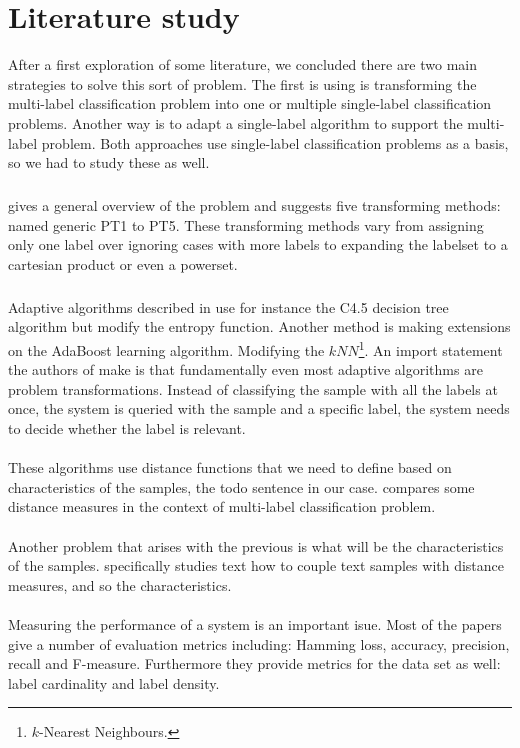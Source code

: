 \section{Literature study}
After a first exploration of some literature, we concluded there are two main strategies to solve this sort of problem. The first is using is transforming the multi-label classification problem into one or multiple single-label classification problems. Another way is to adapt a single-label algorithm to support the multi-label problem. Both approaches use single-label classification problems as a basis, so we had to study these as well.
\subparagraph{}
\cite{Tsoumakas07multi-labelclassification:} gives a general overview of the problem and suggests five transforming methods: named generic PT1 to PT5. These transforming methods vary from assigning only one label over ignoring cases with more labels to expanding the labelset to a cartesian product or even a powerset.
\subparagraph{}
Adaptive algorithms described in \cite{Tsoumakas07multi-labelclassification:} use for instance the C4.5 decision tree algorithm but modify the entropy function. Another method is making extensions on the AdaBoost learning algorithm. Modifying the $kNN$\footnote{$k$-Nearest Neighbours.}. An import statement the authors of \cite{Tsoumakas07multi-labelclassification:} make is that fundamentally even most adaptive algorithms are problem transformations. Instead of classifying the sample with all the labels at once, the system is queried with the sample and a specific label, the system needs to decide whether the label is relevant.
\paragraph{}
These algorithms use distance functions that we need to define based on characteristics of the samples, the todo sentence in our case. \cite{gjorgjioskicomparison} compares some distance measures in the context of multi-label classification problem.
\paragraph{}
Another problem that arises with the previous is what will be the characteristics of the samples. \cite{jing2006ontology} specifically studies text how to couple text samples with distance measures, and so the characteristics.
\paragraph{}
Measuring the performance of a system is an important isue. Most of the papers \cite{KTV08, park2008dimension, Tsoumakas07multi-labelclassification:} give a number of evaluation metrics including: Hamming loss, accuracy, precision, recall and F-measure. Furthermore they provide metrics for the data set as well: label cardinality and label density.